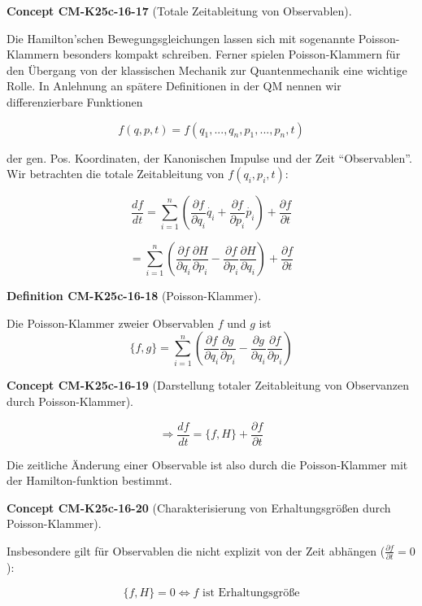 \documentclass[10pt, letterpaper]{article}
\newcommand{\CustomHeading}[3]{%
  \par\medskip\noindent%
  \textbf{#1 #2} \textnormal{(#3)}.\enskip%
}
\newenvironment{DEF}[2]{\CustomHeading{Definition}{#1}{#2}}{}
\newenvironment{CONC}[2]{\CustomHeading{Concept}{#1}{#2}}{}
\begin{document}
\begin{CONC}{CM-K25c-16-17}{Totale Zeitableitung von Observablen}
Die Hamilton'schen Bewegungsgleichungen lassen sich mit sogenannte Poisson-Klammern besonders kompakt schreiben. Ferner spielen Poisson-Klammern für den Übergang von der klassischen Mechanik zur Quantenmechanik eine wichtige Rolle. In Anlehnung an spätere Definitionen in der QM nennen wir differenzierbare Funktionen

\[f(q,p,t) = f(q_1,...,q_n,p_1,...,p_n,t)\]

der gen. Pos. Koordinaten, der Kanonischen Impulse und der Zeit ``Observablen''. Wir betrachten die totale Zeitableitung von $f(q_i,p_i,t)$:

\[\frac{df}{dt} = \sum_{i=1}^n \left(\frac{\partial f}{\partial q_i}\dot{q_i} + \frac{\partial f}{\partial p_i}\dot{p_i}\right) + \frac{\partial f}{\partial t}\]

\[= \sum_{i=1}^n \left(\frac{\partial f}{\partial q_i}\frac{\partial H}{\partial p_i} - \frac{\partial f}{\partial p_i}\frac{\partial H}{\partial q_i}\right) + \frac{\partial f}{\partial t}\]
\end{CONC}

\begin{DEF}{CM-K25c-16-18}{Poisson-Klammer}
Die Poisson-Klammer zweier Observablen $f$ und $g$ ist
\[\{f,g\} = \sum_{i=1}^n \left(\frac{\partial f}{\partial q_i}\frac{\partial g}{\partial p_i} - \frac{\partial g}{\partial q_i}\frac{\partial f}{\partial p_i}\right)\]
\end{DEF}

\begin{CONC}{CM-K25c-16-19}{Darstellung totaler Zeitableitung von Observanzen durch Poisson-Klammer}
\[\Rightarrow \frac{df}{dt} = \{f,H\} + \frac{\partial f}{\partial t}\]

Die zeitliche Änderung einer Observable ist also durch die Poisson-Klammer mit der Hamilton-funktion bestimmt.
\end{CONC}

\begin{CONC}{CM-K25c-16-20}{Charakterisierung von Erhaltungsgrößen durch Poisson-Klammer}
Insbesondere gilt für Observablen die nicht explizit von der Zeit abhängen ($\frac{\partial f}{\partial t} = 0$):

\[\{f,H\} = 0 \Leftrightarrow f \text{ ist Erhaltungsgröße}\]
\end{CONC}
\end{document}
